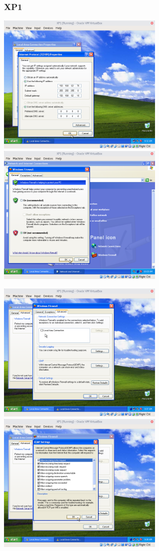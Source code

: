 \subsubsection*{XP1}
\begin{center}
\includegraphics[width=8cm]{img/WinXPNetworkConfiguration.png}
\includegraphics[width=8cm]{img/WinXPFirewallDisabled.png}\par
\includegraphics[width=8cm]{img/WinXPFirewallDisabledForLAN.png}
\includegraphics[width=8cm]{img/WinXPICMPAllowed.png}
\end{center}

